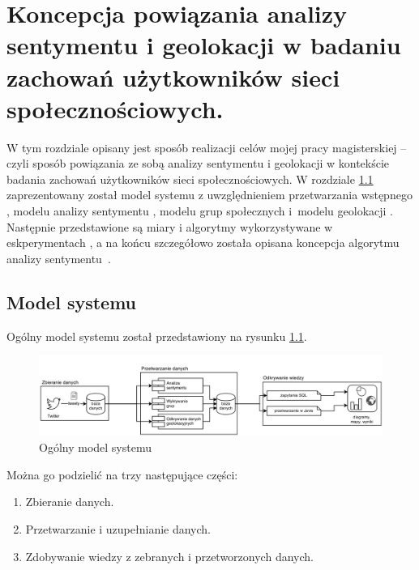 \chapter{Koncepcja powiązania analizy sentymentu i geolokacji w badaniu
zachowań użytkowników sieci społecznościowych.}
\label{chapter:koncepcjarozwiazania}

W tym rozdziale opisany jest sposób realizacji celów mojej pracy magisterskiej
-- czyli sposób powiązania ze sobą analizy sentymentu i geolokacji w kontekście
badania zachowań użytkowników sieci społecznościowych. W rozdziale
\ref{section:modelsystemu} zaprezentowany został model systemu z uwzględnieniem
przetwarzania wstępnego , modelu analizy
sentymentu , modelu grup społecznych
 i~modelu geolokacji
. Następnie przedstawione są miary i algorytmy
wykorzystywane w eskperymentach , a na
końcu szczegółowo została opisana koncepcja algorytmu 
analizy \mbox{sentymentu~}.



\section{Model systemu}
\label{section:modelsystemu}
Ogólny model systemu został przedstawiony na rysunku \ref{image:model-systemu}.

\begin{figure}[ht!]
\centering
\includegraphics[width=160mm]{img/gruby-model.png}
\caption{Ogólny model systemu}
\label{image:model-systemu}
\end{figure}


Można go podzielić na trzy następujące części:
\begin{enumerate}
  \item Zbieranie danych.
  \item Przetwarzanie i uzupełnianie danych.
  \item Zdobywanie wiedzy z zebranych i przetworzonych danych.
\end{enumerate}



